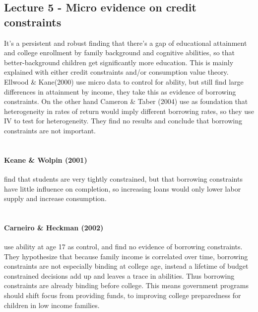 \documentclass[12pt, a4paper]{article}
\begin{document}
\begin{multicols}{2}
\subsection{Lecture 5 - Micro evidence on credit constraints}
It's a persistent and robust finding that there's a gap of educational attainment and college enrollment by family background and cognitive abilities, so that better-background children get significantly more education. This is mainly explained with either credit constraints and/or consumption value theory. Ellwood \& Kane(2000) use micro data to control for ability, but still find large differences in attainment by income, they take this as evidence of borrowing constraints. On the other hand Cameron \& Taber (2004) use as foundation that heterogeneity in rates of return would imply different borrowing rates, so they use IV to test for heterogeneity. They find no results and conclude that borrowing constraints are not important.
\\ \\
\paragraph{Keane \& Wolpin (2001)} find that students are very tightly constrained, but that borrowing constraints have little influence on completion, so increasing loans would only lower labor supply and increase consumption.
\\ \\
\paragraph{Carneiro \& Heckman (2002)} use ability at age 17 as control, and find no evidence of borrowing constraints. They hypothesize that because family income is correlated over time, borrowing constraints are not especially binding at college age, instead a lifetime of budget constrained decisions add up and leaves a trace in abilities. Thus borrowing constraints are already binding before college.
This means government programs should shift focus from providing funds, to improving college preparedness for children in low income families.
\\ \\

\end{multicols}
\end{document}

